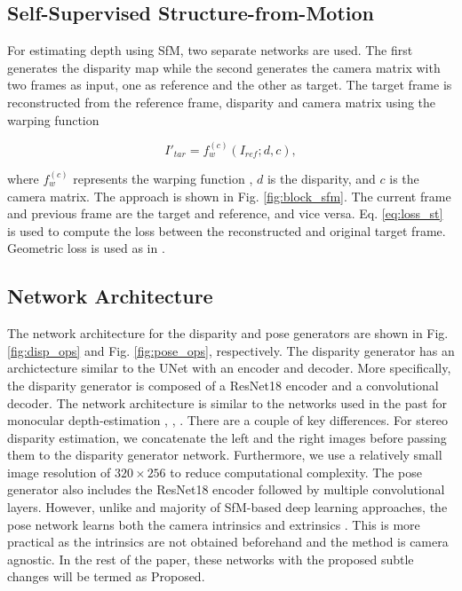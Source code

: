 \documentclass[lettersize,journal]{IEEEtran}
\begin{document}
 \subsection{Self-Supervised Structure-from-Motion}
 For estimating depth using SfM, two separate networks are used. The first generates the disparity map while the second generates the camera matrix with two frames as input, one as reference and the other as target. The target frame is reconstructed from the reference frame, disparity and camera matrix using the warping function \cite{jaderberg2015spatial}
 
 \begin{equation}
    I'_{tar} = f_w^{(c)}(I_{ref}; d, c),
 \end{equation}
 
 \noindent where $f_w^{(c)}$ represents the warping function \cite{jaderberg2015spatial}, $d$ is the disparity, and $c$ is the camera matrix. The approach is shown in Fig. \ref{fig:block_sfm}. The current frame and previous frame are the target and reference, and vice versa. Eq. \ref{eq:loss_st} is used to compute the loss between the reconstructed and original target frame. Geometric loss is used as in \cite{bian2019unsupervised}. 
 
 \subsection{Network Architecture}
 The network architecture for the disparity and pose generators are shown in Fig. \ref{fig:disp_ops} and Fig. \ref{fig:pose_ops}, respectively. The disparity generator has an archictecture similar to the UNet \cite{ronneberger2015u} with an encoder and decoder. More specifically, the disparity generator is composed of a ResNet18 encoder \cite{he2016deep} and a convolutional decoder. The network architecture is similar to the networks used in the past for monocular depth-estimation \cite{godard2017unsupervised}, \cite{godard2019digging}, \cite{bian2019unsupervised}. There are a couple of key differences. For stereo disparity estimation, we concatenate the left and the right images before passing them to the disparity generator network. Furthermore, we use a relatively small image resolution of $320\times256$ to reduce computational complexity. The pose generator also includes the ResNet18 encoder followed by multiple convolutional layers.  However, unlike \cite{bian2019unsupervised} and majority of SfM-based deep learning approaches, the pose network learns both the camera intrinsics and extrinsics \cite{gordon2019depth}. This is more practical as the intrinsics are not obtained beforehand and the method is camera agnostic. In the rest of the paper, these networks with the proposed subtle changes will be termed as Proposed.
 
\end{document}
